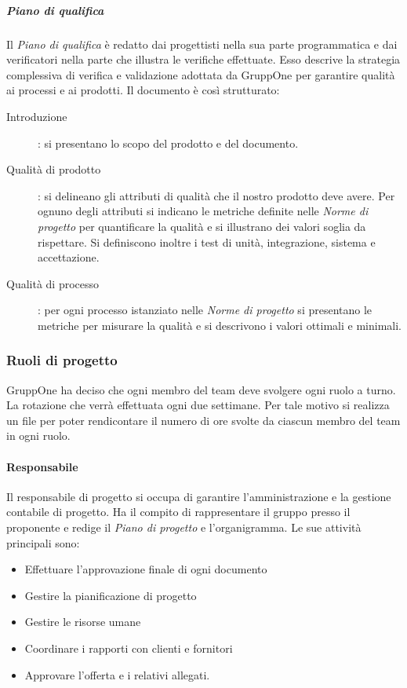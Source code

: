 \documentclass[../norme-di-progetto.tex]{subfiles}
\begin{document}
\subparagraph{Piano di qualifica}%
\label{subp:piano_di_qualifica}

Il \textit{Piano di qualifica} è redatto dai progettisti nella sua parte programmatica e dai verificatori nella parte che illustra le verifiche effettuate. Esso descrive la strategia complessiva di verifica e validazione adottata da GruppOne per garantire qualità ai processi e ai prodotti. Il documento è così strutturato:
\begin{description}
  \item [Introduzione]: si presentano lo scopo del prodotto e del documento.
  \item [Qualità di prodotto]: si delineano gli attributi di qualità che il nostro prodotto deve avere. Per ognuno degli attributi si indicano le metriche definite nelle \textit{Norme di progetto} per quantificare la qualità e si illustrano dei valori soglia da rispettare. Si definiscono inoltre i test di unità, integrazione, sistema e accettazione.
  \item [Qualità di processo]: per ogni processo istanziato nelle \textit{Norme di progetto} si presentano le metriche per misurare la qualità e si descrivono i valori ottimali e minimali.
\end{description}

\subsubsection{Ruoli di progetto}%
\label{subs:ruoli_di_progetto}

GruppOne ha deciso che ogni membro del team deve svolgere ogni ruolo a turno.
La rotazione che verrà effettuata ogni due settimane.
Per tale motivo si realizza un file  per poter rendicontare il numero di ore svolte da ciascun membro del team in ogni ruolo.

\paragraph{Responsabile}%
\label{par:responsabile}
Il responsabile di progetto si occupa di garantire l'amministrazione e la gestione contabile di progetto.
Ha il compito di rappresentare il gruppo presso il proponente e redige il \textit{Piano di progetto} e l'organigramma.
Le sue attività principali sono:

\begin{itemize}
  \item Effettuare l'approvazione finale di ogni documento
  \item Gestire la pianificazione di progetto
  \item Gestire le risorse umane
  \item Coordinare i rapporti con clienti e fornitori
  \item Approvare l'offerta e i relativi allegati.
\end{itemize}
\end{document}
